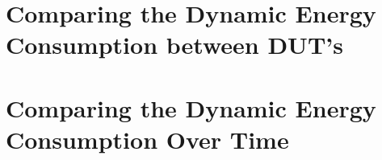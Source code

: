 \section{Comparing the Dynamic Energy Consumption between DUT's}\label{app:comparison}





\section{Comparing the Dynamic Energy Consumption Over Time}\label{app:iterations}



% 
% 























